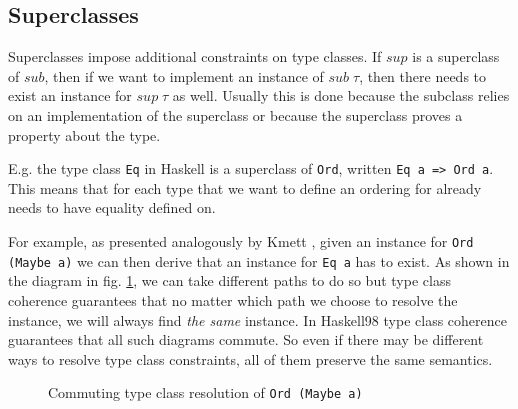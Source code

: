 

\subsection{Superclasses}

Superclasses impose additional constraints on type classes.
If $sup$ is a superclass of $sub$, then if we want to implement an instance of $sub \;\tau$, then there needs to exist an instance for $sup \;\tau$ as well.
Usually this is done because the subclass relies on an implementation of the superclass or because the superclass proves a property about the type.

E.g. the type class \texttt{Eq} in Haskell is a superclass of \texttt{Ord}, written \texttt{Eq a => Ord a}.
This means that for each type that we want to define an ordering for already needs to have equality defined on.

For example, as presented analogously by Kmett \cite{kmett2015}, given an instance for \texttt{Ord (Maybe a)} we can then derive that an instance for \texttt{Eq a} has to exist.
As shown in the diagram in fig. \ref{fig:commuting-resolution}, we can take different paths to do so but type class coherence guarantees that no matter which path we choose to resolve the instance, we will always find \emph{the same} instance.
In Haskell98 type class coherence guarantees that all such diagrams commute.
So even if there may be different ways to resolve type class constraints, all of them preserve the same semantics.

\begin{figure}[ht]
  \caption{Commuting type class resolution of \texttt{Ord (Maybe a)}}
  \label{fig:commuting-resolution}
\end{figure}

